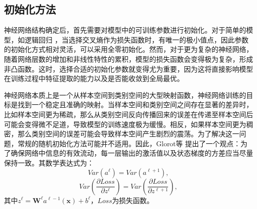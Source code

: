 \subsection{初始化方法}

神经网络结构确定后，首先需要对模型中的可训练参数进行初始化。对于简单的模型，如逻辑回归 \cite{kleinbaum2002logistic}，当选择交叉熵作为损失函数时，有唯一的极小值点，因此参数的初始化方式相对灵活，可以采用全零初始化。然而，对于更为复杂的神经网络，随着网络层数的增加和非线性特性的累积，模型的损失函数会变得极为复杂，形成非凸函数。这时，选择合适的初始化参数就变得尤为重要，因为这将直接影响模型在训练过程中特征提取的能力以及是否能收敛到全局最优。

神经网络本质上是一个从样本空间到类别空间的大型映射函数，神经网络训练的目标是找到一个稳定且准确的映射。当样本空间和类别空间之间存在显著的差异时，比如样本空间更为稀疏，那么从类别空间反向传播回来的误差在传递至样本空间后可能会变得微不足道，导致模型的训练速度极为缓慢。相反，如果样本空间更为稠密，那么类别空间的误差可能会导致样本空间产生剧烈的震荡。为了解决这一问题，常规的随机初始化方法可能并不适用。因此，Glorot等 \cite{glorot2010understanding}提出了一个观点：为了确保网络中信息的有效流动，每一层输出的激活值以及状态梯度的方差应当尽量保持一致。其数学表达式为：
\begin{equation}Var(a^{\ell})=Var(a^{\ell+1}),\end{equation}
\begin{equation}Var(\frac{\partial Loss}{\partial z^{\ell}})=Var(\frac{\partial Loss}{\partial z^{\ell+1}}),\end{equation}
其中$ z^{\ell} = \boldsymbol{W}^{\ell}a^{\ell-1}(\mathbf{x})+b^{\ell} $，$ Loss $为损失函数。

